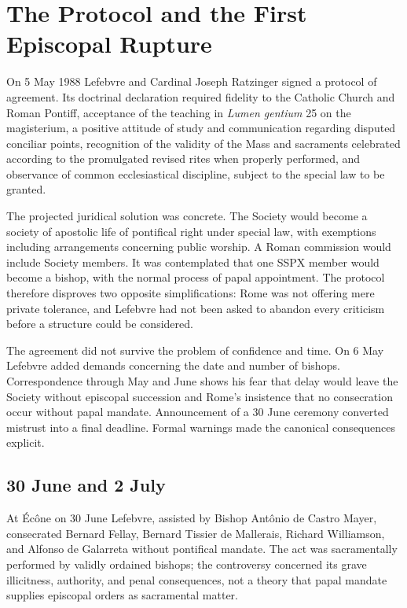 \section{The Protocol and the First Episcopal Rupture}

On 5 May 1988 Lefebvre and Cardinal Joseph Ratzinger signed a protocol of agreement. Its doctrinal declaration required fidelity to the Catholic Church and Roman Pontiff, acceptance of the teaching in \emph{Lumen gentium} 25 on the magisterium, a positive attitude of study and communication regarding disputed conciliar points, recognition of the validity of the Mass and sacraments celebrated according to the promulgated revised rites when properly performed, and observance of common ecclesiastical discipline, subject to the special law to be granted.

The projected juridical solution was concrete. The Society would become a society of apostolic life of pontifical right under special law, with exemptions including arrangements concerning public worship. A Roman commission would include Society members. It was contemplated that one SSPX member would become a bishop, with the normal process of papal appointment. The protocol therefore disproves two opposite simplifications: Rome was not offering mere private tolerance, and Lefebvre had not been asked to abandon every criticism before a structure could be considered.

The agreement did not survive the problem of confidence and time. On 6 May Lefebvre added demands concerning the date and number of bishops. Correspondence through May and June shows his fear that delay would leave the Society without episcopal succession and Rome's insistence that no consecration occur without papal mandate. Announcement of a 30 June ceremony converted mistrust into a final deadline. Formal warnings made the canonical consequences explicit.

\subsection{30 June and 2 July}

At Écône on 30 June Lefebvre, assisted by Bishop Antônio de Castro Mayer, consecrated Bernard Fellay, Bernard Tissier de Mallerais, Richard Williamson, and Alfonso de Galarreta without pontifical mandate. The act was sacramentally performed by validly ordained bishops; the controversy concerned its grave illicitness, authority, and penal consequences, not a theory that papal mandate supplies episcopal orders as sacramental matter.

